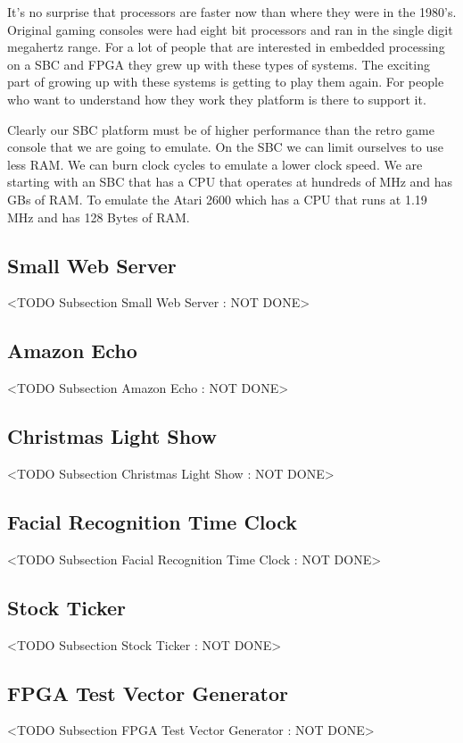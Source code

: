 It's no surprise that processors are faster now than where they were in the 1980's. Original gaming consoles were had eight bit processors and ran in the single digit megahertz range. For a lot of people that are interested in embedded processing on a \ac{SBC} and \ac{FPGA} they grew up with these types of systems. The exciting part of growing up with these systems is getting to play them again. For people who want to understand how they work they platform is there to support it.

Clearly our \ac{SBC} platform must be of higher performance than the retro game console that we are going to emulate. On the \ac{SBC} we can limit ourselves to use less \ac{RAM}. We can burn clock cycles to emulate a lower clock speed. We are starting with an \ac{SBC} that has a \ac{CPU} that operates at hundreds of \ac{MHz} and has \ac{GBs} of \ac{RAM}. To emulate the Atari 2600 which has a \ac{CPU} that runs at 1.19 \ac{MHz} and has 128 Bytes of \ac{RAM}.

\subsection{Small Web Server}
	<TODO Subsection Small Web Server : NOT DONE>

\subsection{Amazon Echo}
	<TODO Subsection Amazon Echo : NOT DONE>

\subsection{Christmas Light Show}
	<TODO Subsection Christmas Light Show : NOT DONE>

\subsection{Facial Recognition Time Clock}
	<TODO Subsection Facial Recognition Time Clock : NOT DONE>

\subsection{Stock Ticker}
	<TODO Subsection Stock Ticker : NOT DONE>

\subsection{FPGA Test Vector Generator}
	<TODO Subsection FPGA Test Vector Generator : NOT DONE>

